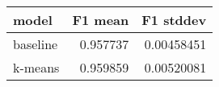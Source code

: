 \begin{tabular}{lrr}
\toprule
 model    &   F1 mean &   F1 stddev \\
\midrule
 baseline &  0.957737 &  0.00458451 \\
 k-means  &  0.959859 &  0.00520081 \\
\bottomrule
\end{tabular}